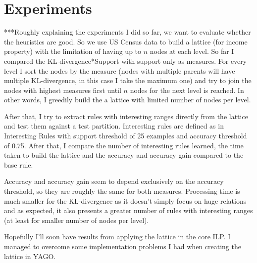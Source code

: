 \chapter{Experiments}
\label{ch:intro}

***Roughly explaining the experiments I did so far, we want to evaluate whether the heuristics are good.
So we use US Census data to build a lattice (for income property) with the limitation of having up to $n$ nodes at each
level. So far I compared the KL-divergence*Support with support only as measures. For every level I sort the nodes by
the measure (nodes with multiple parents will have multiple KL-divergence, in this case I take the maximum one) and try
to join the nodes with highest measures first until $n$ nodes for the next level is reached. In other words, I greedily
build the a lattice with limited number of nodes per level.

After that, I try to extract rules with interesting ranges directly from the lattice and test them against a test
partition. Interesting rules are defined as in \refname{Interesting Rules} with support threshold of 25 examples and
accuracy threshold of 0.75. After that, I compare the number of interesting rules learned, the time taken to build the
lattice and the accuracy and accuracy gain compared to the base rule.

Accuracy and accuracy gain seem to depend exclusively on the accuracy threshold, so they are roughly the same for both
measures. Processing time is much smaller for the KL-divergence as it doesn't simply focus on huge relations and as
expected, it also presents a greater number of rules with interesting ranges (at least for smaller number of nodes per
level).

Hopefully I'll soon have results from applying the lattice in the core ILP. I managed to overcome some
implementation problems I had when creating the lattice in YAGO.

